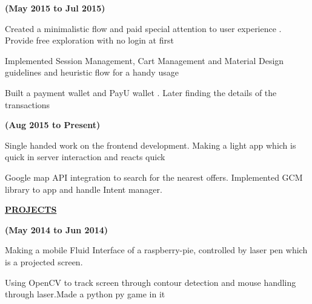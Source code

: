 \documentclass[letterpaper]{deedy-resume} %
\begin{document}
\sectionspace %
\hfill {\textbf{(May 2015 to Jul 2015)}}\\

\begin{tightitemize}
\item Created a minimalistic flow and paid special attention to user experience . Provide free exploration with no login at first
\item Implemented Session Management, Cart Management and Material Design guidelines and heuristic flow for a handy usage
\item Built a payment wallet and PayU wallet . Later finding the details of the transactions 
\end{tightitemize}




\sectionspace %
\hfill {\textbf{(Aug 2015 to Present)}}\\

\begin{tightitemize}
\item Single handed work on the frontend development. Making a light app which is quick in server interaction and reacts quick
\item Google map API integration to search for the nearest offers. Implemented GCM library to app and handle Intent manager.
\end{tightitemize}


{\uppercase\uline{\textbf{\large{Projects}}\hfill}}
\microspace

\hfill {\textbf{(May 2014 to Jun 2014)}}\\

\begin{tightitemize}
\item Making a mobile Fluid Interface of a raspberry-pie, controlled by laser pen which is a projected screen.
\item Using OpenCV to track screen through contour detection and mouse handling through laser.Made a python py game in it
\end{tightitemize}
\end{document}
